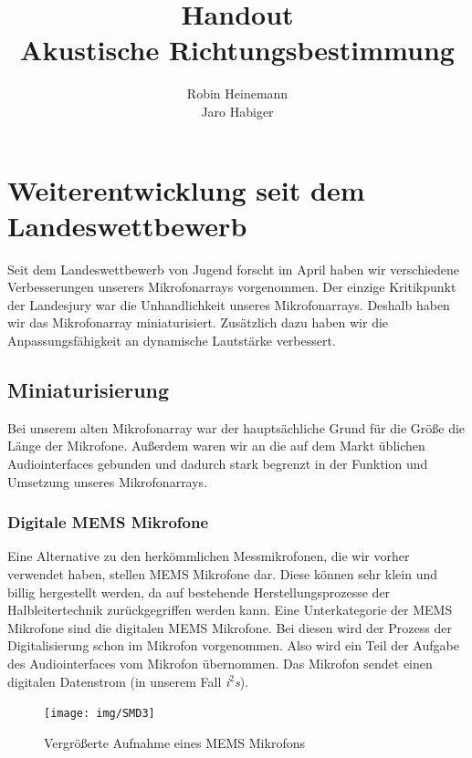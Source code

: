 \documentclass[german,10pt,a4paper,notitlepage,twocolumn]{article}
\title{\small{Handout}\\Akustische Richtungsbestimmung}
\author{Robin Heinemann\\Jaro Habiger}
\begin{document}
\maketitle
{}
\section*{Weiterentwicklung seit dem Landeswettbewerb}
Seit dem Landeswettbewerb von Jugend forscht im April haben wir verschiedene Verbesserungen unserers Mikrofonarrays vorgenommen. Der einzige Kritikpunkt der Landesjury war die Unhandlichkeit unseres Mikrofonarrays. Deshalb haben wir das Mikrofonarray miniaturisiert. Zusätzlich dazu haben wir die Anpassungsfähigkeit an dynamische Lautstärke verbessert.
\subsection*{Miniaturisierung}
Bei unserem alten Mikrofonarray war der hauptsächliche Grund für die Größe die Länge der Mikrofone. Außerdem waren wir an die auf dem Markt üblichen Audiointerfaces gebunden und dadurch stark begrenzt in der Funktion und Umsetzung unseres Mikrofonarrays.
\subsubsection*{Digitale MEMS Mikrofone}
Eine Alternative zu den herkömmlichen Messmikrofonen, die wir vorher verwendet haben, stellen MEMS Mikrofone dar. Diese können sehr klein und billig hergestellt werden, da auf bestehende Herstellungsprozesse der Halbleitertechnik zurückgegriffen werden kann. Eine Unterkategorie der MEMS Mikrofone sind die digitalen MEMS Mikrofone. Bei diesen wird der Prozess der Digitalisierung schon im Mikrofon vorgenommen. Also wird ein Teil der Aufgabe des Audiointerfaces vom Mikrofon übernommen. Das Mikrofon sendet einen digitalen Datenstrom (in unserem Fall \textit{i$^2$s}).
\begin{figure}[H]
    \centering
    \texttt{[image: img/SMD3]}
    \vspace{-2em}
    \caption{Vergrößerte Aufnahme eines MEMS Mikrofons}
    \label{fig:mems}
\end{figure}
\end{document}
